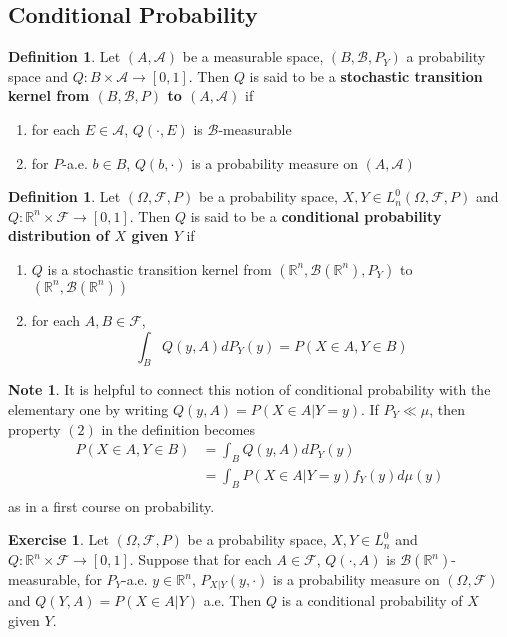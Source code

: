 \documentclass[12pt]{amsart}
\theoremstyle{definition}
\newtheorem{defn}[definition]{Definition}
\newtheorem{note}[definition]{Note}
\newtheorem{ex}[definition]{Exercise}
\newcommand{\Om}{\Omega}
\newcommand{\R}{\mathbb{R}}
\newcommand{\MA}{\mathcal{A}}
\newcommand{\MB}{\mathcal{B}}
\newcommand{\MF}{\mathcal{F}}
\begin{document}
	
	
	\subsection{Conditional Probability}
	
	\begin{defn}
	Let $(A, \MA)$ be a measurable space, $(B, \MB, P_Y)$ a probability space and $Q:B \times \MA \rightarrow [0,1]$. Then $Q$ is said to be a \textbf{stochastic transition kernel from $(B, \MB, P)$ to $(A, \MA)$} if 
	\begin{enumerate}
	\item for each $E \in \MA$, $Q(\cdot, E)$ is $\MB$-measurable
	\item for $P$-a.e. $b \in B$, $Q(b, \cdot)$ is a probability measure on $(A, \MA)$
	\end{enumerate}
	\end{defn}	
	
	\begin{defn}
	Let $(\Om, \MF, P)$ be a probability space, $X,Y \in L_n^0(\Om, \MF, P)$ and $Q: \R^n  \times \MF \rightarrow [0,1]$. Then $Q$ is said to be a \textbf{conditional probability distribution of $X$ given $Y$} if 
	\begin{enumerate}
	\item $Q$ is a stochastic transition kernel from $(\R^n, \MB(\R^n), P_Y)$ to $(\R^n, \MB(\R^n))$
	\item for each $A,B \in \MF$, $$\int_B Q(y, A) dP_Y(y) = P(X \in A, Y \in B)$$ 
	\end{enumerate}
	\end{defn}
	
	\begin{note}
	It is helpful to connect this notion of conditional probability with the elementary one by writing $Q(y, A) = P(X \in A| Y = y)$. If $P_Y \ll \mu$, then property $(2)$ in the definition becomes 
	\begin{align*}
	P(X \in A, Y \in B)  
	&=  \int_B Q(y, A) dP_Y(y) \\
	&= \int_B P(X \in A|Y=y) f_Y(y)d \mu(y) \\
\end{align*}	 
	as in a first course on probability.
	\end{note}	
	
	\begin{ex}
	Let $(\Om, \MF, P)$ be a probability space, $X,Y \in L_n^0$ and $Q: \R^n \times \MF \rightarrow [0,1]$. Suppose that for each $A \in \MF$, $Q(\cdot, A)$ is $\MB(\R^n)$-measurable, for $P_Y$-a.e. $y \in \R^n$, $P_{X|Y}(y, \cdot)$ is a probability measure on $(\Om, \MF)$ and $Q(Y, A) = P(X \in A|Y)$ a.e. Then $Q$ is a conditional probability of $X$ given $Y$.
	\end{ex}	
	
\end{document}
